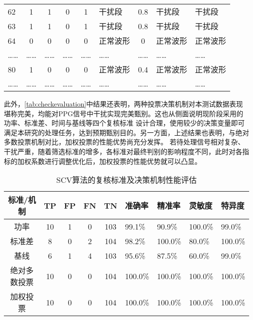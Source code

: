 \begin{table}[htbp]
\begin{tabularx}{\linewidth}{X<{\centering}ccccX<{\centering}cX<{\centering}X<{\centering}}
    62    & 1     & 1     & 0     & 1     & 干扰段   & 0.8   & 干扰段 & 干扰段\\
    63    & 1     & 1     & 0     & 1     & 干扰段   & 0.8   & 干扰段 & 干扰段\\
    64    & 0     & 0     & 0     & 0     & 正常波形  & 0     & 正常波形 & 正常波形\\
    ……    & ……    & ……    & ……    & ……    & ……    & ……    & …… & ……\\
    80    & 1     & 0     & 0     & 0     & 正常波形  & 0.4   & 正常波形 & 正常波形\\
    ……    & ……    & ……    & ……    & ……    & ……    & ……    & …… & ……\\
    \bottomrule
    \end{tabularx}%
\end{table}%

此外，\autoref{tab:checkevaluation}中结果还表明，两种投票决策机制对本测试数据表现堪称完美，均能对PPG信号中干扰实现完美甄别。这也从侧面说明现阶段采用的功率、标准差、时间与基线等四个复核标准
设计合理，使用较少的决策变量即可满足本研究的处理任务，达到预期甄别目的。另一方面，上述结果也表明，与绝对多数投票机制对比，加权投票的性能优势尚充分发挥。
若待处理信号相对复杂、干扰严重，随着筛选标准的增多，各标准对最终判别的影响程度不同，此时对各指标的加权系数进行调整优化后，加权投票的性能优势就可以凸显。
\begin{table}[htbp]
    \centering
    \caption{\label{tab:checkevaluation}SCV算法的复核标准及决策机制性能评估}
    \begin{tabularx}{\linewidth}{cccccX<{\centering}X<{\centering}X<{\centering}X<{\centering}}
        \toprule
        \textbf{标准/机制}&\textbf{TP}&\textbf{FP}&\textbf{FN}&\textbf{TN}&\textbf{准确率}&\textbf{精准率}&\textbf{灵敏度}&\textbf{特异度}\\
        \midrule
            功率    & 10    & 1     & 0     & 103   & 99.1\% & 90.9\% & 100.0\% & 99.0\% \\
            标准差   & 8     & 0     & 2     & 104   & 98.2\% & 100.0\% & 80.0\% & 100.0\% \\
            基线    & 6     & 1     & 4     & 103   & 95.6\% & 87.5\% & 60.0\% & 99.0\% \\
            绝对多数投票 & 10    & 0     & 0     & 104   & 100.0\% & 100.0\% & 100.0\% & 100.0\% \\
            加权投票  & 10    & 0     & 0     & 104   & 100.0\% & 100.0\% & 100.0\% & 100.0\% \\
        \bottomrule
    \end{tabularx}
\end{table}


